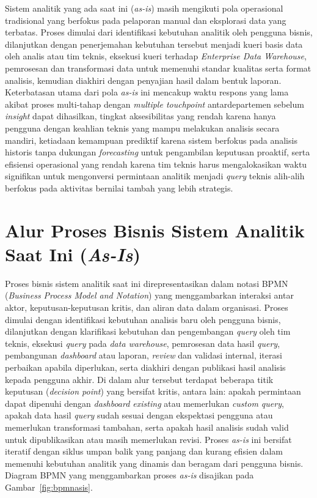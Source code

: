 Sistem analitik yang ada saat ini (\textit{as-is}) masih mengikuti pola operasional tradisional yang berfokus pada pelaporan manual dan eksplorasi data yang terbatas. Proses dimulai dari identifikasi kebutuhan analitik oleh pengguna bisnis, dilanjutkan dengan penerjemahan kebutuhan tersebut menjadi kueri basis data oleh analis atau tim teknis, eksekusi kueri terhadap \textit{Enterprise Data Warehouse}, pemrosesan dan transformasi data untuk memenuhi standar kualitas serta format analisis, kemudian diakhiri dengan penyajian hasil dalam bentuk laporan. Keterbatasan utama dari pola \textit{as-is} ini mencakup waktu respons yang lama akibat proses multi-tahap dengan \textit{multiple touchpoint} antardepartemen sebelum \textit{insight} dapat dihasilkan, tingkat aksesibilitas yang rendah karena hanya pengguna dengan keahlian teknis yang mampu melakukan analisis secara mandiri, ketiadaan kemampuan prediktif karena sistem berfokus pada analisis historis tanpa dukungan \textit{forecasting} untuk pengambilan keputusan proaktif, serta efisiensi operasional yang rendah karena tim teknis harus mengalokasikan waktu signifikan untuk mengonversi permintaan analitik menjadi \textit{query} teknis alih-alih berfokus pada aktivitas bernilai tambah yang lebih strategis.

\section{Alur Proses Bisnis Sistem Analitik Saat Ini (\textit{As-Is})}
\label{sec:asis}

Proses bisnis sistem analitik saat ini direpresentasikan dalam notasi BPMN (\textit{Business Process Model and Notation}) yang menggambarkan interaksi antar aktor, keputusan-keputusan kritis, dan aliran data dalam organisasi. Proses dimulai dengan identifikasi kebutuhan analisis baru oleh pengguna bisnis, dilanjutkan dengan klarifikasi kebutuhan dan pengembangan \textit{query} oleh tim teknis, eksekusi \textit{query} pada \textit{data warehouse}, pemrosesan data hasil \textit{query}, pembangunan \textit{dashboard} atau laporan, \textit{review} dan validasi internal, iterasi perbaikan apabila diperlukan, serta diakhiri dengan publikasi hasil analisis kepada pengguna akhir. Di dalam alur tersebut terdapat beberapa titik keputusan (\textit{decision point}) yang bersifat kritis, antara lain: apakah permintaan dapat dipenuhi dengan \textit{dashboard existing} atau memerlukan \textit{custom query}, apakah data hasil \textit{query} sudah sesuai dengan ekspektasi pengguna atau memerlukan transformasi tambahan, serta apakah hasil analisis sudah valid untuk dipublikasikan atau masih memerlukan revisi. Proses \textit{as-is} ini bersifat iteratif dengan siklus umpan balik yang panjang dan kurang efisien dalam memenuhi kebutuhan analitik yang dinamis dan beragam dari pengguna bisnis. Diagram BPMN yang menggambarkan proses \textit{as-is} disajikan pada Gambar~\ref{fig:bpmnasis}.

